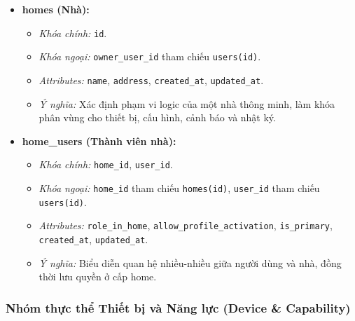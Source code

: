 \begin{itemize}
    \item \textbf{homes (Nhà):}
    \begin{itemize}
        \item \textit{Khóa chính:} \texttt{id}.
        \item \textit{Khóa ngoại:} \texttt{owner\_user\_id} tham chiếu \texttt{users(id)}.
        \item \textit{Attributes:} \texttt{name}, \texttt{address}, \texttt{created\_at}, \texttt{updated\_at}.
        \item \textit{Ý nghĩa:} Xác định phạm vi logic của một nhà thông minh, làm khóa phân vùng cho thiết bị, cấu hình, cảnh báo và nhật ký.
    \end{itemize}

    \item \textbf{home\_users (Thành viên nhà):}
    \begin{itemize}
        \item \textit{Khóa chính:} \texttt{home\_id}, \texttt{user\_id}.
        \item \textit{Khóa ngoại:} \texttt{home\_id} tham chiếu \texttt{homes(id)}, \texttt{user\_id} tham chiếu \texttt{users(id)}.
        \item \textit{Attributes:} \texttt{role\_in\_home}, \texttt{allow\_profile\_activation}, \texttt{is\_primary}, \texttt{created\_at}, \texttt{updated\_at}.
        \item \textit{Ý nghĩa:} Biểu diễn quan hệ nhiều-nhiều giữa người dùng và nhà, đồng thời lưu quyền ở cấp home.
    \end{itemize}
\end{itemize}

\subsubsection{Nhóm thực thể Thiết bị và Năng lực (Device \& Capability)}


